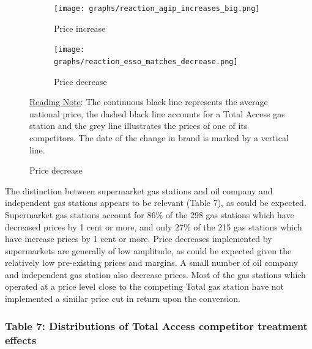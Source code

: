\documentclass[english]{article}
\begin{document}
\begin{figure}[H]
\centering
\caption{Examples of price series of Total Access competitors}
\label{fig:price_reaction_examples}
\begin{subfigure}[b]{\columnwidth}
\centering
\texttt{[image: graphs/reaction\_agip\_increases\_big.png]}
\caption[short]{Price increase}
\end{subfigure}
\begin{subfigure}[b]{\columnwidth}
\centering
\texttt{[image: graphs/reaction\_esso\_matches\_decrease.png]}
\caption[short]{Price decrease}
\end{subfigure}
\flushleft
{\small{}\uline{Reading Note}}{\small{}: } The continuous black line  represents the average national price, the dashed black line accounts for a Total Access gas station and the grey line illustrates the prices of one of its competitors. The date of the change in brand is marked by a vertical line. \medskip{}
\end{figure}

The distinction between supermarket gas stations and oil company and independent gas stations appears to be relevant (Table 7), as could be expected. Supermarket gas stations account for 86\% of the 298 gas stations which have decreased prices by 1 cent or more, and only 27\% of the 215 gas stations which have increase prices by 1 cent or more. Price decreases implemented by supermarkets are generally of low amplitude, as could be expected given the relatively low pre-existing prices and margins. A small number of oil company and independent gas station also decrease prices. Most of the gas stations which operated at a price level close to the competing Total gas station have not implemented a similar price cut in return upon
the conversion. \medskip{}

\subsubsection*{Table 7: Distributions of Total Access competitor treatment effects}
\end{document}
